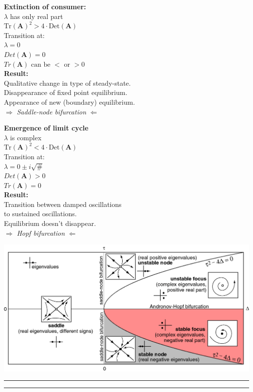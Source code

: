 \documentclass{article}
\newcommand{\ind}{\-\hspace{1cm}}
\begin{document}
\begin{minipage}[t]{\dimexpr.5\textwidth-.5\columnsep}
\textbf{Extinction of consumer:}\\
\ind $\lambda$ has only real part\\
\ind \ind $\text{Tr}(\textbf{A})^2 > 4\cdot\text{Det}(\textbf{A})$\\
\ind Transition at:\\
\ind \ind $\lambda = 0$\\
\ind \ind $ Det(\mathbf{A})=0$\\
\ind \ind $Tr(\mathbf{A}) \text{ can be } < \text{ or } > 0$\\

\textbf{Result:}\\
Qualitative change in type of steady-state.\\
Disappearance of fixed point equilibrium.\\
Appearance of new (boundary) equilibrium.\\

\ind $\Rightarrow$ \emph{Saddle-node bifurcation} $\Leftarrow$
\end{minipage} %
\begin{minipage}[t]{\dimexpr.5\textwidth-.5\columnsep}
\textbf{Emergence of limit cycle}\\
\ind $\lambda$ is complex\\
\ind \ind $\text{Tr}(\textbf{A})^2 < 4\cdot\text{Det}(\mathbf{A})$\\
\ind Transition at:\\
\ind \ind $\lambda = 0 \pm i \sqrt{\#}$\\
\ind \ind $Det(\mathbf{A})>0$\\
\ind \ind $Tr(\mathbf{A})=0$\\

\textbf{Result:}\\
Transition between damped oscillations\\
\ind to sustained oscillations.\\
Equilibrium doesn't disappear.\\

\ind \ind $\Rightarrow$ \emph{Hopf bifurcation}  $\Leftarrow$
\end{minipage}

\begin{center}
  	\includegraphics[width=16cm]{figs/Tr_v_Det.png}
\end{center}


\rule[0.5ex]{\linewidth}{1pt}
\rule[0.5ex]{\linewidth}{1pt}
\end{document}
